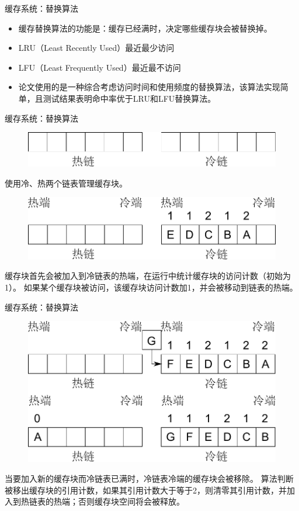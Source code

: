 \documentclass[compress]{beamer}
\begin{document}
\begin{frame}{缓存系统：替换算法}
\begin{itemize}
\item 缓存替换算法的功能是：缓存已经满时，决定哪些缓存块会被替换掉。
\item LRU（Least Recently Used）最近最少访问
\item LFU（Least Frequently Used）最近最不访问
\item 论文使用的是一种综合考虑访问时间和使用频度的替换算法，该算法实现简单，且测试结果表明命中率优于LRU和LFU替换算法。
\end{itemize}
\end{frame}

\begin{frame}{缓存系统：替换算法}
\begin{figure}
\includegraphics[width=0.6\linewidth]{../graph/replace-algo-1}
\end{figure}
使用冷、热两个链表管理缓存块。
\begin{figure}
\includegraphics[width=0.6\linewidth]{../graph/replace-algo-2}
\end{figure}
缓存块首先会被加入到冷链表的热端，在运行中统计缓存块的访问计数（初始为1）。
如果某个缓存块被访问，该缓存块访问计数加1，并会被移动到链表的热端。
\end{frame}

\begin{frame}{缓存系统：替换算法}
\begin{figure}
\includegraphics[width=0.6\linewidth]{../graph/replace-algo-3}
\end{figure}
当要加入新的缓存块而冷链表已满时，冷链表冷端的缓存块会被移除。
算法判断被移出缓存块的引用计数，如果其引用计数大于等于2，则清零其引用计数，并加入到热链表的热端；否则缓存块空间将会被释放。
\end{frame}
\end{document}
